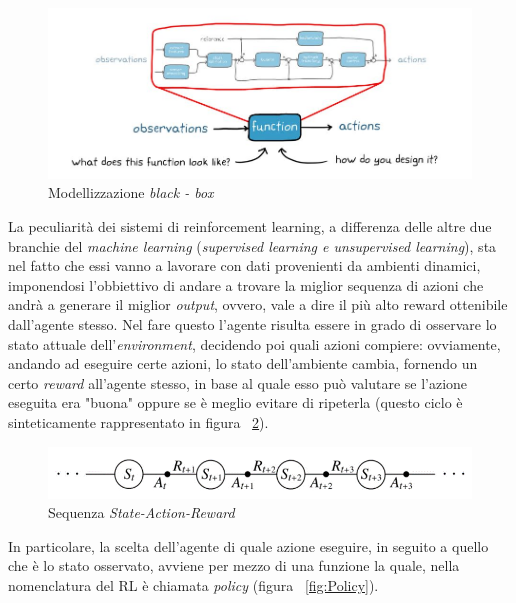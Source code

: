 \begin{figure}[h]
	\includegraphics[width=\textwidth]{Immagini/SqueezingOfControlTheory.JPG}
	\caption{Modellizzazione \textit{black - box}}
	\label{fig:SqueezingOfControlTheory}
\end{figure}

La peculiarità dei sistemi di reinforcement learning, a differenza delle altre due branchie del \textit{machine learning} (\textit{supervised learning e unsupervised learning}), sta nel fatto che essi vanno a lavorare con dati provenienti da ambienti dinamici, imponendosi l'obbiettivo di andare a trovare la miglior sequenza di azioni che andrà a generare il miglior \textit{output}, ovvero, vale a dire il più alto reward ottenibile dall'agente stesso.
Nel fare questo l'agente risulta essere in grado di osservare lo stato attuale dell'\textit{environment}, decidendo poi quali azioni compiere: ovviamente, andando ad eseguire certe azioni, lo stato dell'ambiente cambia, fornendo un certo \textit{reward} all'agente stesso, in base al quale esso può valutare se l'azione eseguita era "buona" oppure se è meglio evitare di ripeterla (questo ciclo è sinteticamente rappresentato in figura ~\ref{fig:State_Action_Reward}).

\begin{figure}[h]
	\includegraphics[width=\textwidth]{Immagini/State_Action_Reward.png}
	\caption{Sequenza \textit{State-Action-Reward}}
	\label{fig:State_Action_Reward}
\end{figure}

In particolare, la scelta dell'agente di quale azione eseguire, in seguito a quello che è lo stato osservato, avviene per mezzo di una funzione la quale, nella nomenclatura del RL è chiamata \textit{policy} (figura ~\ref{fig:Policy}).

